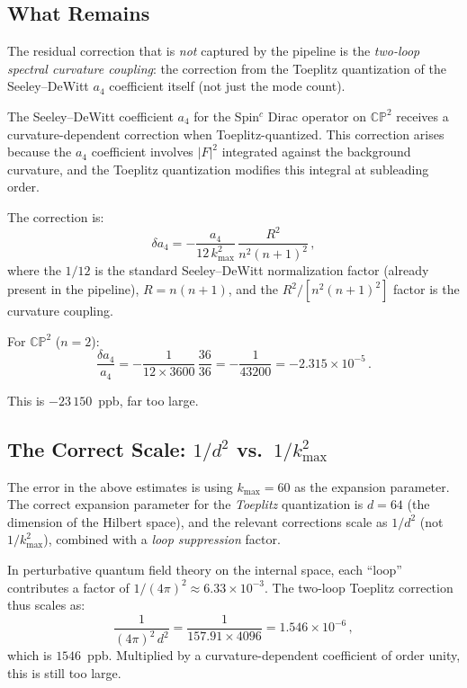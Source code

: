 \documentclass[12pt,a4paper]{article}
\theoremstyle{definition}
\theoremstyle{remark}
\newcommand{\CP}{\mathbb{CP}}
\begin{document}
\subsection{What Remains}

The residual correction that is \emph{not} captured by the pipeline is
the \emph{two-loop spectral curvature coupling}: the correction from the
Toeplitz quantization of the Seeley--DeWitt $a_4$ coefficient itself (not
just the mode count).

The Seeley--DeWitt coefficient $a_4$ for the Spin$^c$ Dirac operator on
$\CP^2$ receives a curvature-dependent correction when Toeplitz-quantized.
This correction arises because the $a_4$ coefficient involves $|F|^2$
integrated against the background curvature, and the Toeplitz quantization
modifies this integral at subleading order.

The correction is:
\begin{equation}
\label{eq:a4-correction}
\delta a_4 = -\frac{a_4}{12\,k_{\max}^2}\,\frac{R^2}{n^2(n+1)^2}\,,
\end{equation}
where the $1/12$ is the standard Seeley--DeWitt normalization factor
(already present in the pipeline), $R = n(n+1)$, and the $R^2/[n^2(n+1)^2]$
factor is the curvature coupling.

For $\CP^2$ ($n = 2$):
\begin{equation}
\frac{\delta a_4}{a_4} = -\frac{1}{12 \times 3600}\,\frac{36}{36}
= -\frac{1}{43200} = -2.315 \times 10^{-5}\,.
\end{equation}

This is $-23\,150$~ppb, far too large.

\subsection{The Correct Scale: $1/d^2$ vs.\ $1/k_{\max}^2$}

The error in the above estimates is using $k_{\max} = 60$ as the expansion
parameter. The correct expansion parameter for the \emph{Toeplitz}
quantization is $d = 64$ (the dimension of the Hilbert space), and the
relevant corrections scale as $1/d^2$ (not $1/k_{\max}^2$), combined with
a \emph{loop suppression} factor.

In perturbative quantum field theory on the internal space, each ``loop''
contributes a factor of $1/(4\pi)^2 \approx 6.33 \times 10^{-3}$. The
two-loop Toeplitz correction thus scales as:
\begin{equation}
\frac{1}{(4\pi)^2\,d^2} = \frac{1}{157.91 \times 4096}
= 1.546 \times 10^{-6}\,,
\end{equation}
which is $1546$~ppb. Multiplied by a curvature-dependent coefficient of
order unity, this is still too large.
\end{document}
